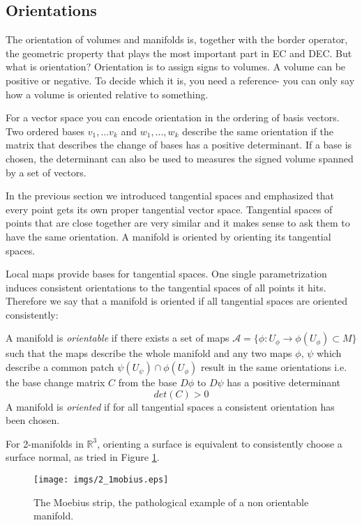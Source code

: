 \subsection{Orientations}

The orientation of volumes and manifolds is, together with the border operator, the geometric property that plays the most important part in EC and DEC. But what is orientation? Orientation is to assign signs to volumes. A volume can be positive or negative. To decide which it is, you need a reference- you can only say how a volume is oriented relative to something.

For a vector space you can encode orientation in the ordering of basis vectors. Two ordered bases $v_1,...v_k$ and $w_1,...,w_k$ describe the same orientation if the matrix that describes the change of bases has a positive determinant. If a base is chosen, the determinant can also be used to measures the signed volume spanned by a set of vectors.

In the previous section we introduced tangential spaces and emphasized that every point gets its own proper tangential vector space. Tangential spaces of points that are close together are very similar and it makes sense to ask them to have the same orientation. A manifold is oriented by orienting its tangential spaces.

Local maps provide bases for tangential spaces. One single parametrization induces consistent orientations to the tangential spaces of all points it hits. Therefore we say that a manifold is oriented if all tangential spaces are oriented consistently:

\begin{definition} A manifold is \emph{orientable} if there exists a set of maps $\mathcal A = \{\phi: U_\phi \to \phi(U_\phi) \subset M\}$ such that the maps describe the whole manifold and any two maps $\phi$, $\psi$ which describe a common patch $\psi(U_\psi) \cap \phi(U_\phi)$ result in the same orientations i.e. the base change matrix $C$ from the base $D\phi$ to $D\psi$ has a positive determinant
\[det(C) >0\]
A manifold is \emph{oriented} if for all tangential spaces a consistent orientation has been chosen.

\end{definition}

For 2-manifolds in $\mathbb R^3$, orienting a surface is equivalent to consistently choose a surface normal, as tried in Figure \ref{fig::2_1_mobius}.

\begin{figure}[t]
\begin{center}
\texttt{[image: imgs/2\_1mobius.eps]}
\caption{The Moebius strip, the pathological example of a non orientable manifold.}
\label{fig::2_1_mobius}
\end{center}
\end{figure}

